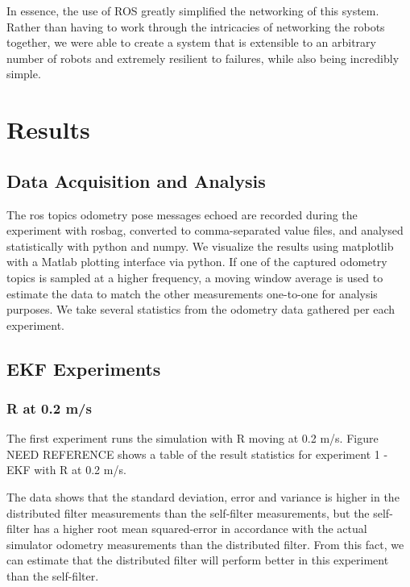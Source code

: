 \documentclass[conference]{IEEEtran} \usepackage[T1]{fontenc} \usepackage[backend=biber, style=ieee]{biblatex}
\begin{document}
In essence, the use of ROS greatly simplified the networking of this system. Rather than having to work through the
intricacies of networking the robots together, we were able to create a system that is extensible to an arbitrary number
of robots and extremely resilient to failures, while also being incredibly simple.

\section{Results} \label{Results} %
\subsection{Data Acquisition and Analysis} \label{Data Acquisition and Analysis}
The ros topics odometry pose messages echoed are 
recorded during the experiment with rosbag, converted to comma-separated value files, and analysed statistically with 
python and numpy. We visualize the results using matplotlib with a Matlab plotting interface via python. If one of the 
captured odometry topics is sampled at a higher frequency, a moving window average is used to estimate the data to match 
the other measurements one-to-one for analysis purposes. We take several statistics from the odometry data gathered per each experiment. 

\subsection{EKF Experiments} \label{EKF Experiments}
\subsubsection{R at 0.2 m/s} \label{EKF .2}
The first experiment runs the simulation with R moving at 0.2 m/s. Figure NEED REFERENCE shows a table of the result statistics for experiment 1 - EKF 
with R at 0.2 m/s. 


The data shows that the standard deviation, error and variance is higher in the distributed filter measurements than the 
self-filter measurements, but the self-filter has a higher root mean squared-error in accordance with the actual simulator odometry measurements than the distributed filter. From this fact, we can estimate that the distributed filter will perform better in this experiment than the self-filter. 
\end{document}
